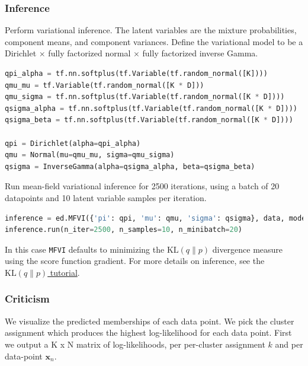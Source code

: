 \subsubsection{Inference}
Perform variational inference.
%
The latent variables are the mixture probabilities,
component means, and component variances.
Define the variational model to be a Dirichlet $\times$ fully factorized normal
$\times$ fully factorized inverse Gamma.
%
\begin{lstlisting}[language=Python]
qpi_alpha = tf.nn.softplus(tf.Variable(tf.random_normal([K])))
qmu_mu = tf.Variable(tf.random_normal([K * D]))
qmu_sigma = tf.nn.softplus(tf.Variable(tf.random_normal([K * D])))
qsigma_alpha = tf.nn.softplus(tf.Variable(tf.random_normal([K * D])))
qsigma_beta = tf.nn.softplus(tf.Variable(tf.random_normal([K * D])))

qpi = Dirichlet(alpha=qpi_alpha)
qmu = Normal(mu=qmu_mu, sigma=qmu_sigma)
qsigma = InverseGamma(alpha=qsigma_alpha, beta=qsigma_beta)
\end{lstlisting}

Run mean-field variational inference for 2500 iterations, using a batch
of 20 datapoints and 10 latent variable samples per iteration.
\begin{lstlisting}[language=Python]
inference = ed.MFVI({'pi': qpi, 'mu': qmu, 'sigma': qsigma}, data, model)
inference.run(n_iter=2500, n_samples=10, n_minibatch=20)
\end{lstlisting}
In this case
\texttt{MFVI} defaults to minimizing the
$\text{KL}(q\|p)$ divergence measure using the score function
gradient.
For more details on inference, see the \href{tut_KLqp.html}{$\text{KL}(q\|p)$ tutorial}.


\subsubsection{Criticism}

We visualize the predicted memberships of each data point.
We pick the cluster assignment which produces
the highest log-likelihood for each data point.
First we output a K x N matrix of log-likelihoods, per
per-cluster assignment $k$ and per data-point $\mathbf{x}_n$.


